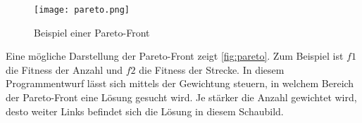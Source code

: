 \begin{figure}[h]
    \centering
    \texttt{[image: pareto.png]}
    \caption{Beispiel einer Pareto-Front \cite{Paretofr62:online}}
    \label{fig:pareto}
\end{figure}

Eine mögliche Darstellung der Pareto-Front zeigt \autoref{fig:pareto}.
Zum Beispiel ist $f1$ die Fitness der Anzahl und $f2$ die Fitness der Strecke.
In diesem Programmentwurf lässt sich mittels der Gewichtung steuern,
in welchem Bereich der Pareto-Front eine Lösung gesucht wird.
Je stärker die Anzahl gewichtet wird, desto weiter Links befindet sich die Lösung in diesem Schaubild.

